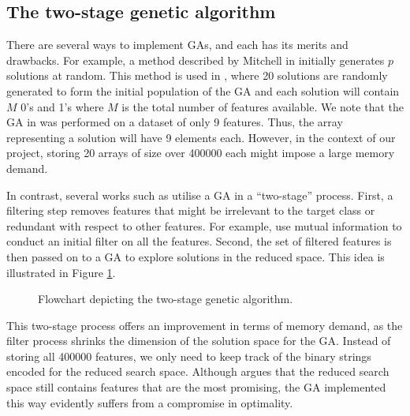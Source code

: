 \documentclass[12pt, twoside, a4paper]{report}
\begin{document}
\subsection{The two-stage genetic algorithm}\label{bg:ga:twostage}
There are several ways to implement GAs, and each has its merits and drawbacks. For example, a method described by Mitchell in \cite{RefWorks:205} initially generates $p$ solutions at random. This method is used in \cite{RefWorks:206}, where 20 solutions are randomly generated to form the initial population of the GA and each solution will contain $M$ 0's and 1's where $M$ is the total number of features available. We note that the GA in \cite{RefWorks:206} was performed on a dataset of only 9 features. Thus, the array representing a solution will have 9 elements each. However, in the context of our project, storing 20 arrays of size over 400000 each might impose a large memory demand.

In contrast, several works such as \cite{RefWorks:197, RefWorks:198, RefWorks:199, RefWorks:200, RefWorks:203} utilise a GA in a ``two-stage'' process. First, a filtering step removes features that might be irrelevant to the target class or redundant with respect to other features. For example, \cite{RefWorks:197, RefWorks:198, RefWorks:203} use mutual information to conduct an initial filter on all the features. Second, the set of filtered features is then passed on to a GA to explore solutions in the reduced space. This idea is illustrated in Figure \ref{bg:fs:ga:twoStage}.

\begin{figure}
\centering
{}
\caption{Flowchart depicting the two-stage genetic algorithm.}
\label{bg:fs:ga:twoStage}
\end{figure}

This two-stage process offers an improvement in terms of memory demand, as the filter process shrinks the dimension of the solution space for the GA. Instead of storing all 400000 features, we only need to keep track of the binary strings encoded for the reduced search space. Although \cite{RefWorks:201} argues that the reduced search space still contains features that are the most promising, the GA implemented this way evidently suffers from a compromise in optimality.
\end{document}
